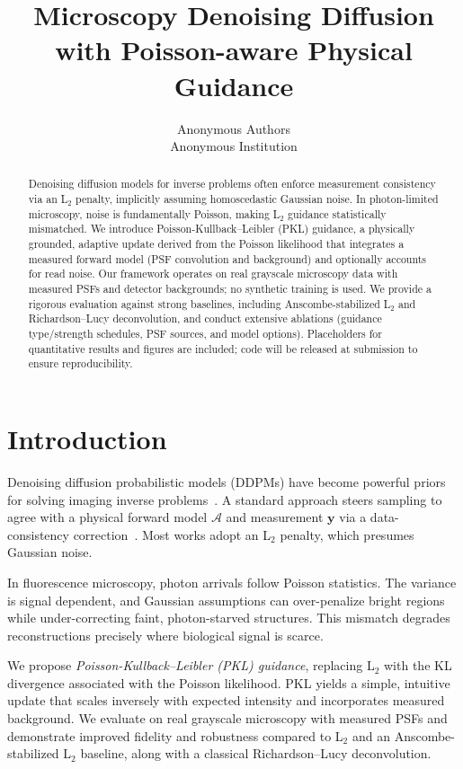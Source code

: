 \documentclass{article}
\title{Microscopy Denoising Diffusion with Poisson-aware Physical Guidance}
\author{Anonymous Authors\\
Anonymous Institution}
\begin{document}
\maketitle

\begin{abstract}
Denoising diffusion models for inverse problems often enforce measurement consistency via an L$_2$ penalty, implicitly assuming homoscedastic Gaussian noise. In photon-limited microscopy, noise is fundamentally Poisson, making L$_2$ guidance statistically mismatched. We introduce Poisson-Kullback--Leibler (PKL) guidance, a physically grounded, adaptive update derived from the Poisson likelihood that integrates a measured forward model (PSF convolution and background) and optionally accounts for read noise. Our framework operates on real grayscale microscopy data with measured PSFs and detector backgrounds; no synthetic training is used. We provide a rigorous evaluation against strong baselines, including Anscombe-stabilized L$_2$ and Richardson--Lucy deconvolution, and conduct extensive ablations (guidance type/strength schedules, PSF sources, and model options). Placeholders for quantitative results and figures are included; code will be released at submission to ensure reproducibility.
\end{abstract}

\section{Introduction}
\label{sec:intro}
Denoising diffusion probabilistic models (DDPMs) have become powerful priors for solving imaging inverse problems~\cite{ho2020ddpm, song2022solving}. A standard approach steers sampling to agree with a physical forward model $\mathcal{A}$ and measurement $\mathbf{y}$ via a data-consistency correction~\cite{chung2022diffusion}. Most works adopt an L$_2$ penalty, which presumes Gaussian noise.

In fluorescence microscopy, photon arrivals follow Poisson statistics. The variance is signal dependent, and Gaussian assumptions can over-penalize bright regions while under-correcting faint, photon-starved structures. This mismatch degrades reconstructions precisely where biological signal is scarce.

We propose \emph{Poisson-Kullback--Leibler (PKL) guidance}, replacing L$_2$ with the KL divergence associated with the Poisson likelihood. PKL yields a simple, intuitive update that scales inversely with expected intensity and incorporates measured background. We evaluate on real grayscale microscopy with measured PSFs and demonstrate improved fidelity and robustness compared to L$_2$ and an Anscombe-stabilized L$_2$ baseline, along with a classical Richardson--Lucy deconvolution.
\end{document}
